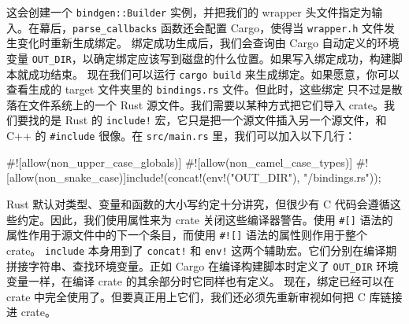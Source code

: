 这会创建一个 \texttt{bindgen::\allowbreak{}Builder} 实例，并把我们的 wrapper 头文件指定为输入。在幕后，\texttt{parse\_\allowbreak{}callbacks} 函数还会配置 Cargo，使得当 \texttt{wrapper.h} 文件发生变化时重新生成绑定。
绑定成功生成后，我们会查询由 Cargo 自动定义的环境变量 \texttt{OUT\_DIR}，以确定绑定应该写到磁盘的什么位置。如果写入绑定成功，构建脚本就成功结束。
\label{idx:idx_025c90a1}
现在我们可以运行 \texttt{cargo build} 来生成绑定。如果愿意，你可以查看生成的
target 文件夹里的 \texttt{bindings.rs} 文件。但此时，这些绑定
只不过是散落在文件系统上的一个 Rust 源文件。我们需要以某种方式把它们导入 crate。我们要找的是 Rust 的 \texttt{include!} 宏，它只是把一个源文件插入另一个源文件，和 C++ 的 \texttt{\#include} 很像。在 \texttt{src/main.rs} 里，我们可以加入以下几行：
\begin{codebox}[text]
#![allow(non_upper_case_globals)]
#![allow(non_camel_case_types)]
#![allow(non_snake_case)]include!(concat!(env!("OUT_DIR"), "/bindings.rs"));
\end{codebox}
Rust 默认对类型、变量和函数的大小写约定十分讲究，但很少有 C 代码会遵循这些约定。因此，我们使用属性来为 crate 关闭这些编译器警告。使用 \texttt{\#[]} 语法的属性作用于源文件中的下一个条目，而使用 \texttt{\#![]} 语法的属性则作用于整个 crate。
\texttt{include} 本身用到了 \texttt{concat!} 和 \texttt{env!} 这两个辅助宏。它们分别在编译期拼接字符串、查找环境变量。正如 Cargo 在编译构建脚本时定义了
\texttt{OUT\_DIR} 环境变量一样，在编译
crate 的其余部分时它同样也有定义。
现在，绑定已经可以在 crate 中完全使用了。但要真正用上它们，我们还必须先重新审视如何把 C 库链接进 crate。
